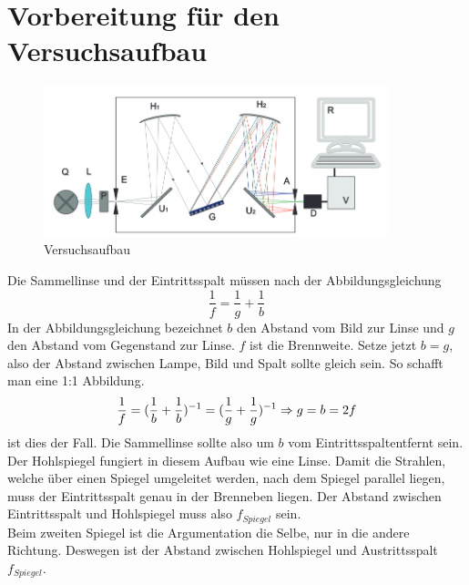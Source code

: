 

\section{Vorbereitung für den Versuchsaufbau}

\begin{figure}[h]
    \begin{center}
        \includegraphics[width=10cm]{Bilder/SP1.PNG}
    \end{center}
    \caption{Versuchsaufbau}
\end{figure}
Die Sammellinse und der Eintrittsspalt müssen nach der Abbildungsgleichung 
\begin{equation}
    \frac{1}{f}= \frac{1}{g}+\frac{1}{b}   
\end{equation}
In der Abbildungsgleichung bezeichnet $b$ den Abstand vom Bild zur Linse und $g$ den Abstand vom Gegenstand zur Linse. $f$ ist die Brennweite. Setze jetzt $b = g $, also der Abstand zwischen 
Lampe, Bild und Spalt sollte gleich sein. So schafft man eine 1:1 Abbildung. 
\begin{equation}
    \frac{1}{f} = (\frac{1}{b}+\frac{1}{b})^{-1} = (\frac{1}{g}+\frac{1}{g})^{-1}
    \newline
    \Rightarrow g = b = 2f
\end{equation}
ist dies der Fall. Die Sammellinse sollte also um $b$ vom Eintrittsspaltentfernt sein.\\
Der Hohlspiegel fungiert in diesem Aufbau wie eine Linse. Damit die Strahlen, welche über einen Spiegel umgeleitet werden, nach dem Spiegel parallel liegen, muss der Eintrittsspalt genau in der Brenneben liegen. Der Abstand zwischen Eintrittsspalt und Hohlspiegel muss also $f_{Spiegel}$ sein.\\
Beim zweiten Spiegel ist die Argumentation die Selbe, nur in die andere Richtung. Deswegen ist der Abstand zwischen Hohlspiegel und Austrittsspalt $f_{Spiegel}$.